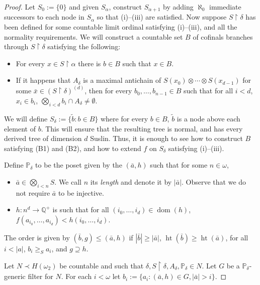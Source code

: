 \documentclass[10pt,a4paper]{amsart}
\DeclareMathOperator{\dom}{dom}
\DeclareMathOperator{\hht}{ht}
\newcommand{\Q}{\mathbb{Q}}
\newcommand{\es}{\emptyset}
\newcommand{\res}{\restriction}
\renewcommand{\P}{\mathbb{P}}
\begin{document}
\begin{proof}
  Let $S_{0} := \{0\}$ and given
  $S_{\alpha}$, construct $S_{\alpha+1}$ by adding $\aleph_{0}$
  immediate successors to each node in $S_{\alpha}$ so that
  (i)--(iii) are satisfied. Now
  suppose $S \res \delta$
  has been defined for some countable limit ordinal satisfying (i)--(iii),
  and all the normality requirements. We will construct
  a countable set $B$ of cofinals branches through $S \res \delta$
  satisfying the following:
  \begin{itemize}
    \item[(B1)] For every $x \in S \res \alpha$ there is $b \in B$ such
    that $x \in B$.
    \item[(B2)] If it happens that $A_{\delta}$ is a maximal
    antichain of $S(x_{0}) \otimes \cdots \otimes S(x_{d-1})$ for
    some $\bar{x} \in (S\res \delta)^{(d)}$, then for every
    $b_{0},\dots,b_{n-1} \in B$ such that for all $i < d$,
    $x_{i} \in b_{i}$, $\bigotimes_{i < d}b_{i} \cap A_{\delta} \neq \es$.
  \end{itemize}
  We will define $S_{\delta}:= \{\tilde{b} : b \in B\}$ where for every
  $b \in B$, $\tilde{b}$ is a node above each element of $b$.
  This will ensure that the resulting tree is normal,
  and has every derived tree of dimension $d$ Suslin. Thus,
  it is enough to see how to construct $B$ satisfying (B1) and (B2),
  and how to extend $f$ on $S_{\delta}$ satisfying (i)--(iii).

  Define $\P_{\delta}$ to be the poset given by the
  $(\bar{a},h)$ such that for some $n \in \omega$,
  \begin{itemize}
    \item $\bar{a} \in \bigotimes_{i < n}S$. We call $n$ its \emph{length}
    and denote it by $|\bar{a}|$.
    Observe that we do not require $\bar{a}$ to be injective.
    \item $h : n^{d} \to \Q^{+}$ is such that for all
    $(i_{0},\dots,i_{d}) \in \dom(h)$,
    $f(a_{i_{0}},\dots,a_{i_{d}}) < h(i_{0},\dots,i_{d})$.
  \end{itemize}
  The order is given by $(\bar{b},g) \le (\bar{a},h)$ if
  $|\bar{b}| \ge |\bar{a}|$, $\hht(\bar{b}) \ge \hht(\bar{a})$,
  for all $i < |a|$, $b_{i} \ge_{S} a_{i}$, and
  $g \supseteq h$.

  Let $N \prec H(\omega_{2})$ be countable and such that
  $\delta,S\res\delta,A_{\delta},\P_{\delta} \in N$. Let
  $G$ be a $\P_{\delta}$-generic filter for $N$. For each
  $i < \omega$ let $b_{i} := \{a_{i} : (\bar{a},h) \in G, |\bar{a}| > i\}$.


\end{proof}
\end{document}
